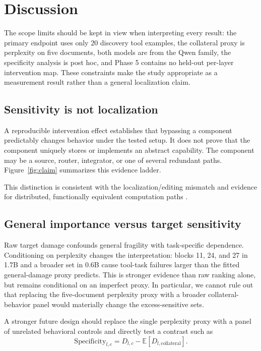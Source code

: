 \documentclass[10pt,twocolumn]{article}
\begin{document}
\section{Discussion}
The scope limits should be kept in view when interpreting every result: the primary endpoint uses only 20 discovery tool examples, the collateral proxy is perplexity on five documents, both models are from the Qwen family, the specificity analysis is post hoc, and Phase 5 contains no held-out per-layer intervention map. These constraints make the study appropriate as a measurement result rather than a general localization claim.

\subsection{Sensitivity is not localization}
A reproducible intervention effect establishes that bypassing a component predictably changes behavior under the tested setup. It does not prove that the component uniquely stores or implements an abstract capability. The component may be a source, router, integrator, or one of several redundant paths. Figure~\ref{fig:claim} summarizes this evidence ladder.

This distinction is consistent with the localization/editing mismatch \cite{hase2023localization} and evidence for distributed, functionally equivalent computation paths \cite{hochman2026factual}.

\subsection{General importance versus target sensitivity}
Raw target damage confounds general fragility with task-specific dependence. Conditioning on perplexity changes the interpretation: blocks 11, 24, and 27 in 1.7B and a broader set in 0.6B cause tool-task failures larger than the fitted general-damage proxy predicts. This is stronger evidence than raw ranking alone, but remains conditional on an imperfect proxy. In particular, we cannot rule out that replacing the five-document perplexity proxy with a broader collateral-behavior panel would materially change the excess-sensitive sets.

A stronger future design should replace the single perplexity proxy with a panel of unrelated behavioral controls and directly test a contrast such as
\begin{equation}
\mathrm{Specificity}_{l,c}=D_{l,c}-\mathbb{E}[D_{l,\mathrm{collateral}}].
\end{equation}
\end{document}
